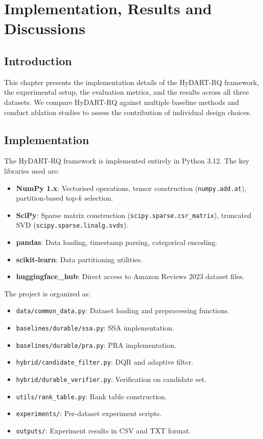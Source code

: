 \chapter{Implementation, Results and Discussions}
\label{ch:results}

\section{Introduction}

This chapter presents the implementation details of the HyDART-RQ framework, the experimental setup, the evaluation metrics, and the results across all three datasets. We compare HyDART-RQ against multiple baseline methods and conduct ablation studies to assess the contribution of individual design choices.

\section{Implementation}

The HyDART-RQ framework is implemented entirely in Python 3.12. The key libraries used are:
\begin{itemize}
  \item \textbf{NumPy 1.x}: Vectorised operations, tensor construction (\texttt{numpy.add.at}), partition-based top-$k$ selection.
  \item \textbf{SciPy}: Sparse matrix construction (\texttt{scipy.sparse.csr\_matrix}), truncated SVD (\texttt{scipy.sparse.linalg.svds}).
  \item \textbf{pandas}: Data loading, timestamp parsing, categorical encoding.
  \item \textbf{scikit-learn}: Data partitioning utilities.
  \item \textbf{huggingface\_hub}: Direct access to Amazon Reviews 2023 dataset files.
\end{itemize}

The project is organized as:
\begin{itemize}
  \item \texttt{data/common\_data.py}: Dataset loading and preprocessing functions.
  \item \texttt{baselines/durable/ssa.py}: SSA implementation.
  \item \texttt{baselines/durable/pra.py}: PRA implementation.
  \item \texttt{hybrid/candidate\_filter.py}: DQR and adaptive filter.
  \item \texttt{hybrid/durable\_verifier.py}: Verification on candidate set.
  \item \texttt{utils/rank\_table.py}: Rank table construction.
  \item \texttt{experiments/}: Per-dataset experiment scripts.
  \item \texttt{outputs/}: Experiment results in CSV and TXT format.
\end{itemize}

